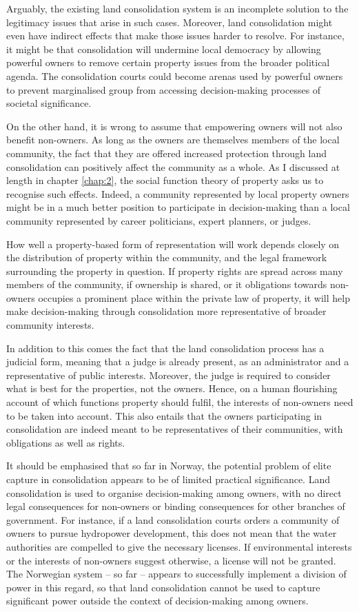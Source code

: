 Arguably, the existing land consolidation system is an incomplete solution to the legitimacy issues that arise in such cases. Moreover, land consolidation might even have indirect effects that make those issues harder to resolve. For instance, it might be that consolidation will undermine local democracy by allowing powerful owners to remove certain property issues from the broader political agenda. The consolidation courts could become arenas used by powerful owners to prevent marginalised group from accessing decision-making processes of societal significance.

On the other hand, it is wrong to assume that empowering owners will not also benefit non-owners. As long as the owners are themselves members of the local community, the fact that they are offered increased protection through land consolidation can positively affect the community as a whole. As I discussed at length in chapter \ref{chap:2}, the social function theory of property asks us to recognise such effects. Indeed, a community represented by local property owners might be in a much better position to participate in decision-making than a local community represented by career politicians, expert planners, or judges.

How well a property-based form of representation will work depends closely on the distribution of property within the community, and the legal framework surrounding the property in question. If property rights are spread across many members of the community, if ownership is shared, or it obligations towards non-owners occupies a prominent place within the private law of property, it will help make decision-making through consolidation more representative of broader community interests.

In addition to this comes the fact that the land consolidation process has a judicial form, meaning that a judge is already present, as an administrator and a representative of public interests. Moreover, the judge is required to consider what is best for the properties, not the owners. Hence, on a human flourishing account of which functions property should fulfil, the interests of non-owners need to be taken into account. This also entails that the owners participating in consolidation are indeed meant to be representatives of their communities, with obligations as well as rights.

It should be emphasised that so far in Norway, the potential problem of elite capture in consolidation appears to be of limited practical significance. Land consolidation is used to organise decision-making among owners, with no direct legal consequences for non-owners or binding consequences for other branches of government. For instance, if a land consolidation courts orders a community of owners to pursue hydropower development, this does not mean that the water authorities are compelled to give the necessary licenses. If environmental interests or the interests of non-owners suggest otherwise, a license will not be granted. The Norwegian system -- so far -- appears to successfully implement a division of power in this regard, so that land consolidation cannot be used to capture significant power outside the context of decision-making among owners.

